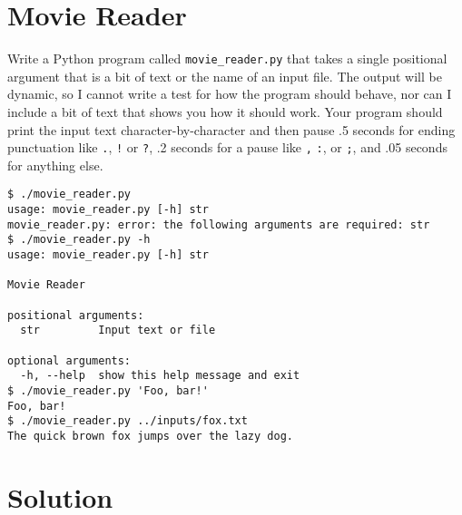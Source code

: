 \documentclass[]{article}
\begin{document}
\hypertarget{movie-reader}{%
\section{Movie Reader}\label{movie-reader}}

Write a Python program called \texttt{movie\_reader.py} that takes a
single positional argument that is a bit of text or the name of an input
file. The output will be dynamic, so I cannot write a test for how the
program should behave, nor can I include a bit of text that shows you
how it should work. Your program should print the input text
character-by-character and then pause .5 seconds for ending punctuation
like \texttt{.}, \texttt{!} or \texttt{?}, .2 seconds for a pause like
\texttt{,} \texttt{:}, or \texttt{;}, and .05 seconds for anything else.

\begin{verbatim}
$ ./movie_reader.py
usage: movie_reader.py [-h] str
movie_reader.py: error: the following arguments are required: str
$ ./movie_reader.py -h
usage: movie_reader.py [-h] str

Movie Reader

positional arguments:
  str         Input text or file

optional arguments:
  -h, --help  show this help message and exit
$ ./movie_reader.py 'Foo, bar!'
Foo, bar!
$ ./movie_reader.py ../inputs/fox.txt
The quick brown fox jumps over the lazy dog.
\end{verbatim}

\pagebreak

\hypertarget{solution-6}{%
\section{Solution}\label{solution-6}}
\end{document}
